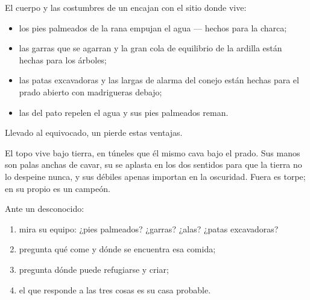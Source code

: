 \begin{proposition}\label{prop:g2:where-animals-live:fit}
El cuerpo y las costumbres de un  encajan con el sitio donde vive:
\begin{itemize}
  \item los pies palmeados de la rana empujan el agua --- hechos para
        la charca;
  \item las garras que se agarran y la gran cola de equilibrio de la
        ardilla están hechas para los árboles;
  \item las patas excavadoras y las largas  de alarma del conejo
        están hechas para el prado abierto con madrigueras debajo;
  \item las  del pato repelen el agua y sus pies palmeados reman.
\end{itemize}
Llevado al  equivocado, un  pierde estas ventajas.
\end{proposition}
\admitted

\begin{example}\label{ex:g2:where-animals-live:mole}
El topo vive bajo tierra, en túneles que él mismo cava bajo el prado.
Sus manos son palas anchas de cavar, su  se aplasta en los dos
sentidos para que la tierra no lo despeine nunca, y sus  débiles
apenas importan en la oscuridad. Fuera es torpe; en su propio 
es un campeón.
\end{example}

\begin{method}\label{met:g2:where-animals-live:matching}
Ante un  desconocido:
\begin{enumerate}
  \item mira su equipo: ¿pies palmeados? ¿garras? ¿alas? ¿patas
        excavadoras?
  \item pregunta qué come y dónde se encuentra esa comida;
  \item pregunta dónde puede refugiarse y criar;
  \item el  que responde a las tres cosas es su casa probable.
\end{enumerate}
\end{method}

